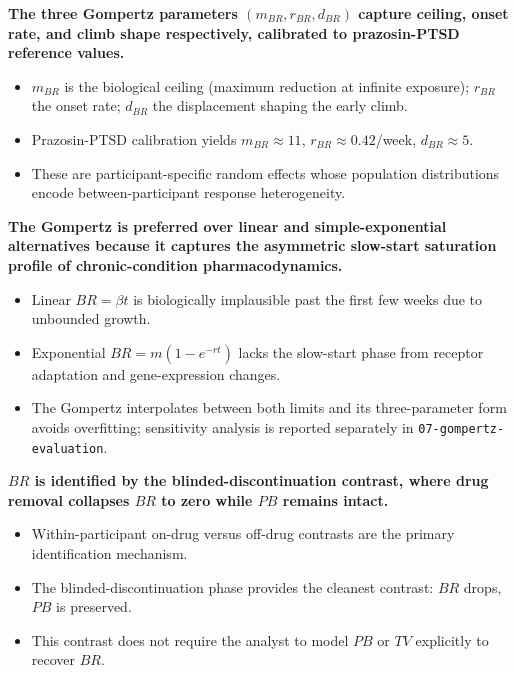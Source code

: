 \documentclass[
  11pt,
]{article}
\begin{document}
\textbf{The three Gompertz parameters $(m_{BR}, r_{BR}, d_{BR})$ capture ceiling, onset rate, and climb shape respectively, calibrated to prazosin-PTSD reference values.}

\begin{itemize}\setlength{\itemsep}{2pt}\setlength{\parskip}{0pt}
\item $m_{BR}$ is the biological ceiling (maximum reduction at infinite exposure); $r_{BR}$ the onset rate; $d_{BR}$ the displacement shaping the early climb.
\item Prazosin-PTSD calibration yields $m_{BR} \approx 11$, $r_{BR} \approx 0.42$/week, $d_{BR} \approx 5$.
\item These are participant-specific random effects whose population distributions encode between-participant response heterogeneity.
\end{itemize}

\textbf{The Gompertz is preferred over linear and simple-exponential alternatives because it captures the asymmetric slow-start saturation profile of chronic-condition pharmacodynamics.}

\begin{itemize}\setlength{\itemsep}{2pt}\setlength{\parskip}{0pt}
\item Linear $BR = \beta t$ is biologically implausible past the first few weeks due to unbounded growth.
\item Exponential $BR = m(1 - e^{-rt})$ lacks the slow-start phase from receptor adaptation and gene-expression changes.
\item The Gompertz interpolates between both limits and its three-parameter form avoids overfitting; sensitivity analysis is reported separately in \texttt{07-gompertz-evaluation}.
\end{itemize}

\textbf{$BR$ is identified by the blinded-discontinuation contrast, where drug removal collapses $BR$ to zero while $PB$ remains intact.}

\begin{itemize}\setlength{\itemsep}{2pt}\setlength{\parskip}{0pt}
\item Within-participant on-drug versus off-drug contrasts are the primary identification mechanism.
\item The blinded-discontinuation phase provides the cleanest contrast: $BR$ drops, $PB$ is preserved.
\item This contrast does not require the analyst to model $PB$ or $TV$ explicitly to recover $BR$.
\end{itemize}
\end{document}
